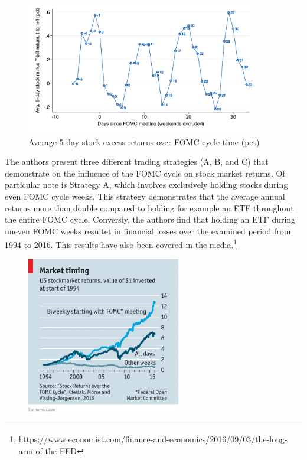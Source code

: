 \begin{figure}[h]
    \centering
    \label{cies19_fig1}
    \includegraphics[width=0.9\textwidth]{figures/cies19/fig1}
    \caption{Average 5-day stock excess returns over FOMC cycle time (pct) \parencite{cieslak_stock_2019} }
\end{figure}

The authors present three different trading strategies (A, B, and C) that demonstrate on the influence of the FOMC cycle on stock market returns.  Of particular note is Strategy A, which involves exclusively holding stocks during even FOMC cycle weeks. This strategy demonstrates that the average annual returns more than double compared to holding for example an ETF throughout the entire FOMC cycle.  Conversly, the authors find that holding an ETF during uneven FOMC weeks resultet in financial losses over the examined period from 1994 to 2016.  This results have also been covered in the media.\footnote{\url{https://www.economist.com/finance-and-economics/2016/09/03/the-long-arm-of-the-FED}}

\begin{figure}[h]
    \centering
     \label{FED_long_arm}
    \includegraphics[width=0.6\textwidth]{figures/20160903_FNC453.png}
    \caption{\cite{noauthor_long_2016}}
\end{figure}


